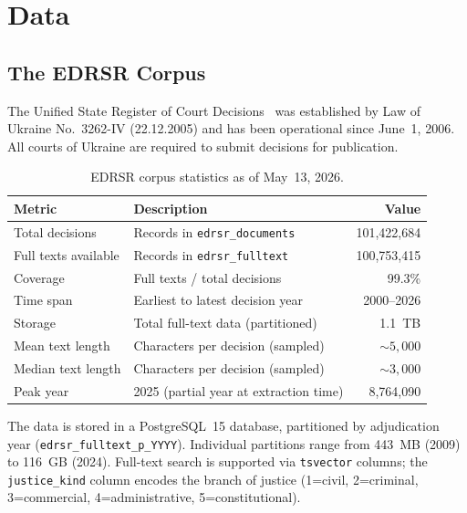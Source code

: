 \documentclass[11pt]{article}
\begin{document}
\section{Data}
\label{sec:data}

\subsection{The EDRSR Corpus}

The Unified State Register of Court Decisions~\citep{edrsr2024} was established by Law of Ukraine No.~3262-IV (22.12.2005) and has been operational since June~1, 2006.
All courts of Ukraine are required to submit decisions for publication.

\begin{table}[h]
\centering
\small
\begin{tabularx}{\textwidth}{@{}l X r@{}}
\toprule
\textbf{Metric} & \textbf{Description} & \textbf{Value} \\
\midrule
Total decisions & Records in \texttt{edrsr\_documents} & 101{,}422{,}684 \\
Full texts available & Records in \texttt{edrsr\_fulltext} & 100{,}753{,}415 \\
Coverage & Full texts / total decisions & 99.3\% \\
Time span & Earliest to latest decision year & 2000--2026 \\
Storage & Total full-text data (partitioned) & 1.1~TB \\
Mean text length & Characters per decision (sampled) & ${\sim}5{,}000$ \\
Median text length & Characters per decision (sampled) & ${\sim}3{,}000$ \\
Peak year & 2025 (partial year at extraction time) & 8{,}764{,}090 \\
\bottomrule
\end{tabularx}
\caption{EDRSR corpus statistics as of May~13, 2026.}
\label{tab:corpus}
\end{table}

The data is stored in a PostgreSQL~15 database, partitioned by adjudication year (\texttt{edrsr\_fulltext\_p\_YYYY}).
Individual partitions range from 443~MB (2009) to 116~GB (2024).
Full-text search is supported via \texttt{tsvector} columns; the \texttt{justice\_kind} column encodes the branch of justice (1=civil, 2=criminal, 3=commercial, 4=administrative, 5=constitutional).
\end{document}
